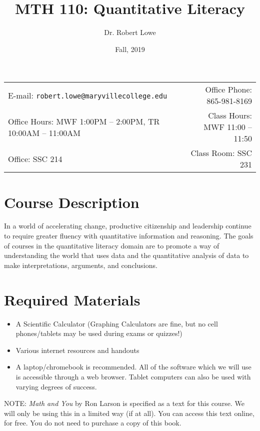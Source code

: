 \documentclass[11pt]{article}
\title{MTH 110: Quantitative Literacy}
\author{Dr. Robert Lowe}
\date{Fall, 2019}
\newcommand{\blankline}{\quad\pagebreak[2]}
\begin{document}
\maketitle

\blankline

\begin{tabular*}{.93\textwidth}{@{\extracolsep{\fill}}lr}


E-mail: \texttt{robert.lowe@maryvillecollege.edu} & Office Phone: 865-981-8169 \\

 Office Hours: MWF 1:00PM -- 2:00PM, TR 10:00AM -- 11:00AM  &  Class Hours: MWF 11:00 -- 11:50\\

 Office: SSC 214 & Class Room: SSC 231\\
\hline
\end{tabular*}

\vspace{5 mm}


\section*{Course Description}

In a world of accelerating change, productive citizenship and leadership continue to require greater
fluency with quantitative information and reasoning. The goals of courses in the quantitative literacy
domain are to promote a way of understanding the world that uses data and the quantitative analysis of
data to make interpretations, arguments, and conclusions.


\section*{Required Materials}

\begin{itemize}
\item A Scientific Calculator (Graphing Calculators are fine, but no cell phones/tablets may be used during exams or quizzes!)
\item Various internet resources and handouts
\item A laptop/chromebook is recommended.  All of the software which we will use is accessible through a web browser.  Tablet computers can also be used with varying degrees of success. 

\end{itemize}
NOTE: {\em Math and You} by Ron Larson is specified as a text for this course.  We will
only be using this in a limited way (if at all).  You can access this text online, for free. You do not need to purchase a copy of this book.
\end{document}
